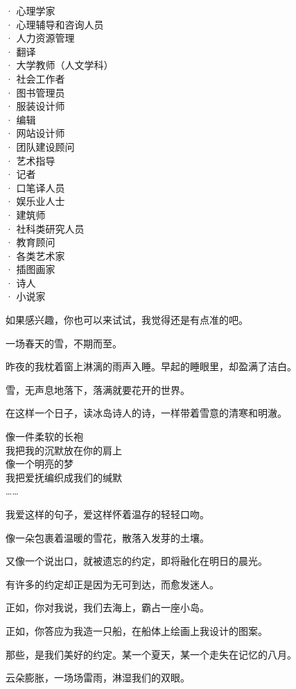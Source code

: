 \documentclass[12pt,a4paper]{article}
\begin{document}
		\indentenv{4\ccwd}{0\ccwd}{\hspace{-1ex}}
		· 心理学家 \\
		· 心理辅导和咨询人员 \\
		· 人力资源管理 \\
		· 翻译 \\
		· 大学教师（人文学科） \\
		· 社会工作者 \\
		· 图书管理员 \\
		· 服装设计师 \\
		· 编辑 \\
		· 网站设计师 \\
		· 团队建设顾问 \\
		· 艺术指导 \\
		· 记者 \\
		· 口笔译人员 \\
		· 娱乐业人士 \\
		· 建筑师 \\
		· 社科类研究人员 \\
		· 教育顾问 \\
		· 各类艺术家 \\
		· 插图画家 \\
		· 诗人 \\
		· 小说家
		\endindentenv

		如果感兴趣，你也可以来试试，我觉得还是有点准的吧。


	\endwriting



		一场春天的雪，不期而至。\par
		昨夜的我枕着窗上淋漓的雨声入睡。早起的睡眼里，却盈满了洁白。\par
		雪，无声息地落下，落满就要花开的世界。

		在这样一个日子，读冰岛诗人的诗，一样带着雪意的清寒和明澈。

		\longpoem{}{}{}
		像一件柔软的长袍 \\
		我把我的沉默放在你的肩上 \\
		像一个明亮的梦 \\
		我把爱抚编织成我们的缄默 \\
		……
		\endlongpoem

		我爱这样的句子，爱这样怀着温存的轻轻口吻。\par
		像一朵包裹着温暖的雪花，散落入发芽的土壤。\par
		又像一个说出口，就被遗忘的约定，即将融化在明日的晨光。\par
		有许多的约定却正是因为无可到达，而愈发迷人。\par
		正如，你对我说，我们去海上，霸占一座小岛。\par
		正如，你答应为我造一只船，在船体上绘画上我设计的图案。\par
		那些，是我们美好的约定。某一个夏天，某一个走失在记忆的八月。\par
		云朵膨胀，一场场雷雨，淋湿我们的双眼。
\end{document}
